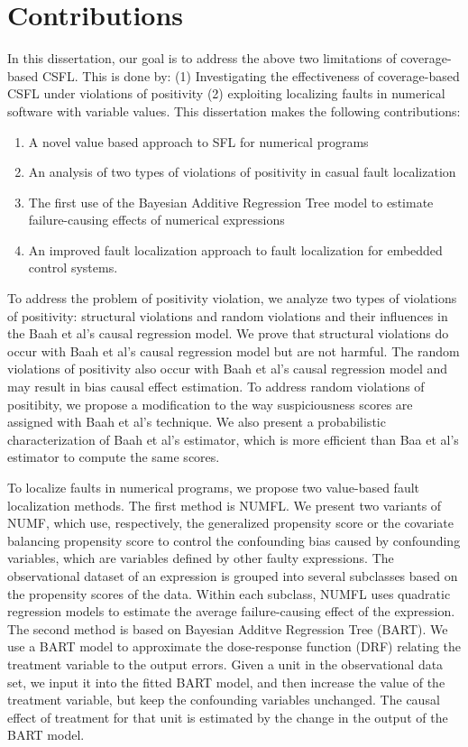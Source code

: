 \section {Contributions}
In this dissertation, our goal is to address the above two limitations of coverage-based CSFL. This is done by: (1) Investigating the effectiveness of coverage-based CSFL under violations of positivity (2) exploiting localizing faults in numerical software with variable values. This dissertation makes the following contributions: 
\begin{enumerate}
\item A novel value based approach to SFL for numerical programs
\item An analysis of two types of violations of positivity in casual fault localization
\item The first use of the Bayesian Additive Regression Tree model to estimate failure-causing effects of numerical expressions
\item An improved fault localization approach to fault localization for embedded control systems.
\end{enumerate}

To address the problem of positivity violation, we analyze two types of violations of positivity: structural violations and random violations and their influences in the Baah et al's causal regression model. We prove that structural violations do occur with Baah et al's causal regression model \cite{baah2010causal} but are not harmful. The random violations of positivity also occur with Baah et al's causal regression model and may result in bias causal effect estimation. To address random violations of positibity, we propose a modification to the way suspiciousness scores are assigned with Baah et al's technique. We also present a probabilistic characterization of Baah et al's estimator, which is more efficient than Baa et al's estimator to compute the same scores.

To localize faults in numerical programs, we propose two value-based fault localization methods. The first method is NUMFL. We present two variants of NUMF, which use, respectively, the generalized propensity score or the covariate balancing propensity score to control the confounding bias caused by confounding variables, which are variables defined by other faulty expressions.  The  observational dataset of an expression is grouped into several subclasses based on the propensity scores of the data. Within each subclass, NUMFL uses quadratic regression models to estimate the average failure-causing effect of the expression. The second method is based on Bayesian Additve Regression Tree (BART). We use a BART model to approximate the dose-response function (DRF) relating the treatment variable to the output errors. Given a unit in the observational data set, we input it into the fitted BART model, and then increase the value of the treatment variable, but keep the confounding variables unchanged. The causal effect of treatment for that unit is estimated by the change in the output of the BART model. 

